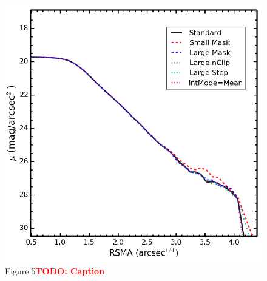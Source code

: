 \documentclass[preprint]{aastex}
\newcommand{\todo}[1]{\textcolor{red}{\textbf{TODO: #1}}}
\begin{document}
\begin{CJK*}{UTF8}{gbsn}
\clearpage
{}
\begin{figure}
    \centering 
    \includegraphics[width=14.0cm]{fig/redbcg_1_HSC-I_full_imgsub_ellip_default_compare.png}
    \caption{Figure.5\todo{Caption}}
    \label{figure:5}
\end{figure}


\end{CJK*}

\clearpage 

%
\end{document}
